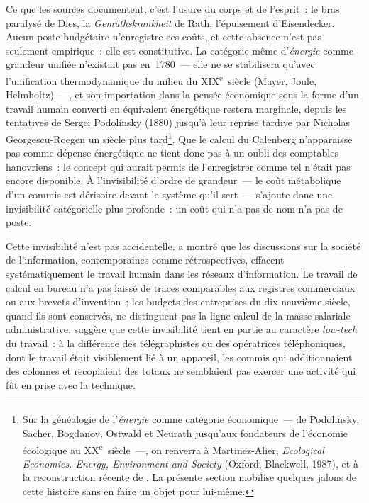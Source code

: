 Ce que les sources documentent, c'est l'usure du corps et de l'esprit~: le bras paralysé de Dies, la \og \emph{Gemüthskrankheit}\fg{} de Rath, l'épuisement d'Eisendecker. Aucun poste budgétaire n'enregistre ces coûts, et cette absence n'est pas seulement empirique~: elle est constitutive. La catégorie même d'\emph{énergie} comme grandeur unifiée n'existait pas en~1780~--- elle ne se stabilisera qu'avec l'unification thermodynamique du milieu du XIX\textsuperscript{e}~siècle (Mayer, Joule, Helmholtz)~---, et son importation dans la pensée économique sous la forme d'un travail humain converti en équivalent énergétique restera marginale, depuis les tentatives de Sergei Podolinsky (1880) jusqu'à leur reprise tardive par Nicholas Georgescu-Roegen un siècle plus tard\footnote{Sur la généalogie de l'\emph{énergie} comme catégorie économique~--- de Podolinsky, Sacher, Bogdanov, Ostwald et Neurath jusqu'aux fondateurs de l'économie écologique au XX\textsuperscript{e}~siècle~---, on renverra à Martinez-Alier, \emph{Ecological Economics. Energy, Environment and Society} (Oxford, Blackwell, 1987), et à la reconstruction récente de \textcite{vianna_franco_history_2023}. La présente section mobilise quelques jalons de cette histoire sans en faire un objet pour lui-même.}. Que le calcul du Calenberg n'apparaisse pas comme \og dépense énergétique\fg{} ne tient donc pas à un oubli des comptables hanovriens~: le concept qui aurait permis de l'enregistrer comme tel n'était pas encore disponible. À l'invisibilité d'ordre de grandeur~--- le coût métabolique d'un commis est dérisoire devant le système qu'il sert~--- s'ajoute donc une invisibilité catégorielle plus profonde~: un coût qui n'a pas de nom n'a pas de poste.

%
Cette invisibilité n'est pas accidentelle. \textcite{downey_virtual_2001} a montré que les discussions sur la \og société de l'information\fg{}, contemporaines comme rétrospectives, effacent systématiquement le travail humain dans les réseaux d'information. Le travail de calcul en bureau n'a pas laissé de traces comparables aux registres commerciaux ou aux brevets d'invention~; les budgets des entreprises du dix-neuvième siècle, quand ils sont conservés, ne distinguent pas la ligne \og calcul\fg{} de la masse salariale administrative. \textcite{rosenhaft_hands_2003} suggère que cette invisibilité tient en partie au caractère \og \emph{low-tech}\fg{} du travail~: à la différence des télégraphistes ou des opératrices téléphoniques, dont le travail était visiblement lié à un appareil, les commis qui additionnaient des colonnes et recopiaient des totaux ne semblaient pas exercer une activité qui fût en prise avec la technique.

